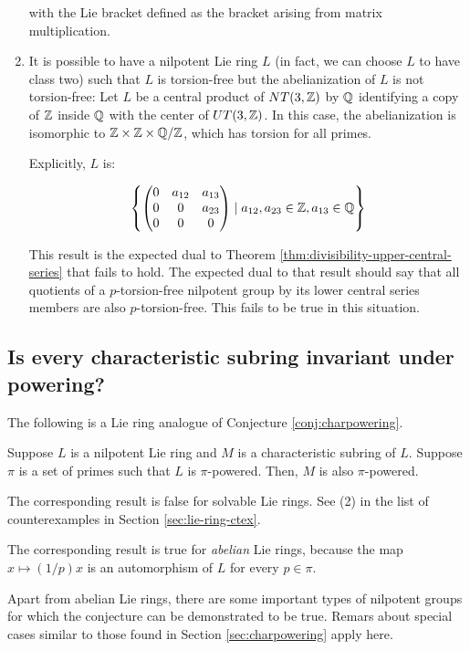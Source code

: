 \begin{enumerate}
    
    with the Lie bracket defined as the bracket arising from matrix multiplication.

\item It is possible to have a nilpotent Lie ring $L$ (in fact, we can
  choose $L$ to have class two) such that $L$ is torsion-free but the
  abelianization of $L$ is not torsion-free: Let $L$ be a central
  product of $NT(3,\mathbb{Z})$ by $\mathbb{Q}$ identifying a copy of $\mathbb{Z}$ inside $\mathbb{Q}$
  with the center of $UT(3,\mathbb{Z})$. In this case, the abelianization is
  isomorphic to $\mathbb{Z} \times \mathbb{Z} \times \mathbb{Q}/\mathbb{Z}$, which has torsion for all
  primes.

  Explicitly, $L$ is:

  $$\left \{\begin{pmatrix}
0 & a_{12} & a_{13} \\
0 & 0 & a_{23}\\
0 & 0 & 0\end{pmatrix} \mid a_{12},a_{23} \in \mathbb{Z}, a_{13} \in \mathbb{Q} \right \}$$

  This result is the expected dual to Theorem
  \ref{thm:divisibility-upper-central-series} that fails to hold. The
  expected dual to that result should say that all quotients of a
  $p$-torsion-free nilpotent group by its lower central series members
  are also $p$-torsion-free. This fails to be true in this situation.
\end{enumerate}

\subsection{Is every characteristic subring invariant under powering?}

The following is a Lie ring analogue of Conjecture \ref{conj:charpowering}.

\begin{conjecture}\label{conj:charpowering-lie}
  Suppose $L$ is a nilpotent Lie ring and $M$ is a characteristic
  subring of $L$. Suppose $\pi$ is a set of primes such that $L$ is
  $\pi$-powered. Then, $M$ is also $\pi$-powered.
\end{conjecture}

The corresponding result is false for solvable Lie rings. See (2) in
the list of counterexamples in Section \ref{sec:lie-ring-ctex}.

The corresponding result is true for {\em abelian} Lie rings, because
the map $x \mapsto (1/p)x$ is an automorphism of $L$ for every $p \in
\pi$.

Apart from abelian Lie rings, there are some important types of
nilpotent groups for which the conjecture can be demonstrated to be
true. Remars about special cases similar to those found in Section
\ref{sec:charpowering} apply here.

